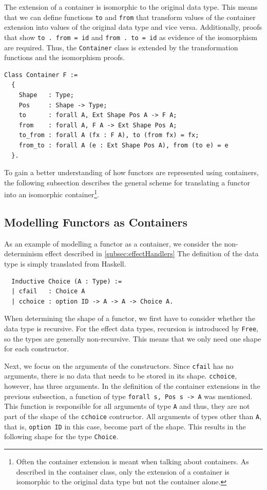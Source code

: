 \documentclass[a4paper, 11pt, fleqn, twoside]{scrreprt}
\newcommand{\hinl}[1]{\texttt{#1}}
\newcommand{\cinl}[1]{\texttt{#1}}
\begin{document}
The extension of a container is isomorphic to the original data type.
This means that we can define functions \cinl{to} and \cinl{from} that transform values of the container extension into values of the original data type and vice versa.
Additionally, proofs that show \cinl{to . from = id} and \hinl{from . to = id} as evidence of the isomorphism are required.
Thus, the \cinl{Container} class is extended by the transformation functions and the isomorphism proofs.

\begin{verbatim}
Class Container F :=
  {
    Shape   : Type;
    Pos     : Shape -> Type;
    to      : forall A, Ext Shape Pos A -> F A;
    from    : forall A, F A -> Ext Shape Pos A;
    to_from : forall A (fx : F A), to (from fx) = fx;
    from_to : forall A (e : Ext Shape Pos A), from (to e) = e
  }.
\end{verbatim}

To gain a better understanding of how functors are represented using containers, the following subsection describes the general scheme for translating a functor into an isomorphic container\footnote{Often the container extension is meant when talking about containers. As described in the container class, only the extension of a container is isomorphic to the original data type but not the container alone.}.

\subsection{Modelling Functors as Containers}
As an example of modelling a functor as a container, we consider the non-determinism effect described in \autoref{subsec:effectHandlers}
The definition of the data type is simply translated from Haskell.

\begin{verbatim}
  Inductive Choice (A : Type) :=
  | cfail   : Choice A
  | cchoice : option ID -> A -> A -> Choice A.
\end{verbatim}

When determining the shape of a functor, we first have to consider whether the data type is recursive.
For the effect data types, recursion is introduced by \cinl{Free}, so the types are generally non-recursive.
This means that we only need one shape for each constructor.

Next, we focus on the arguments of the constructors.
Since \cinl{cfail} has no arguments, there is no data that needs to be stored in its shape.
\cinl{cchoice}, however, has three arguments.
In the definition of the container extensions in the previous subsection, a function of type \cinl{forall s, Pos s -> A} was mentioned.
This function is responsible for all arguments of type \cinl{A} and thus, they are not part of the shape of the \cinl{cchoice} contructor.
All arguments of types other than \cinl{A}, that is, \cinl{option ID} in this case, become part of the shape.
This results in the following shape for the type \cinl{Choice}.
\end{document}
